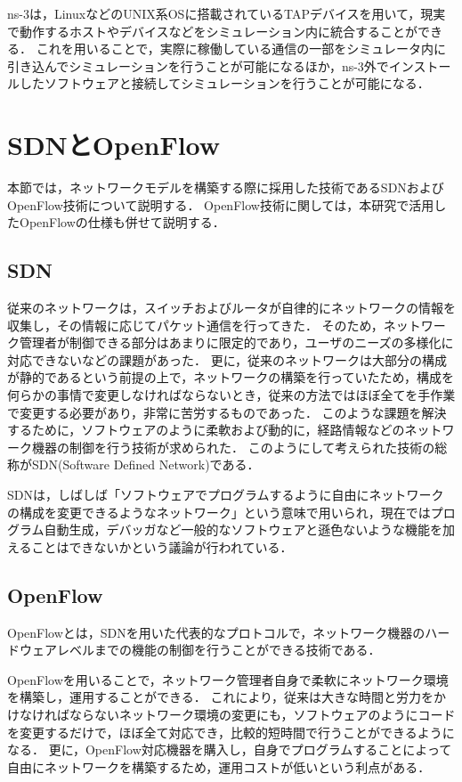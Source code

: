 ns-3は，LinuxなどのUNIX系OSに搭載されているTAPデバイスを用いて，現実で動作するホストやデバイスなどをシミュレーション内に統合することができる．
これを用いることで，実際に稼働している通信の一部をシミュレータ内に引き込んでシミュレーションを行うことが可能になるほか，ns-3外でインストールしたソフトウェアと接続してシミュレーションを行うことが可能になる．

\section{SDNとOpenFlow}

本節では，ネットワークモデルを構築する際に採用した技術であるSDNおよびOpenFlow技術について説明する．
OpenFlow技術に関しては，本研究で活用したOpenFlowの仕様も併せて説明する．

\subsection{SDN}

従来のネットワークは，スイッチおよびルータが自律的にネットワークの情報を収集し，その情報に応じてパケット通信を行ってきた\cite{openflownet}．
そのため，ネットワーク管理者が制御できる部分はあまりに限定的であり，ユーザのニーズの多様化に対応できないなどの課題があった．
更に，従来のネットワークは大部分の構成が静的であるという前提の上で，ネットワークの構築を行っていたため，構成を何らかの事情で変更しなければならないとき，従来の方法ではほぼ全てを手作業で変更する必要があり，非常に苦労するものであった．
このような課題を解決するために，ソフトウェアのように柔軟および動的に，経路情報などのネットワーク機器の制御を行う技術が求められた．
このようにして考えられた技術の総称がSDN(Software Defined Network)である．

SDNは，しばしば「ソフトウェアでプログラムするように自由にネットワークの構成を変更できるようなネットワーク」という意味で用いられ\cite{openflowjapanese}，現在ではプログラム自動生成，デバッガなど一般的なソフトウェアと遜色ないような機能を加えることはできないかという議論が行われている．

\subsection{OpenFlow}

OpenFlowとは，SDNを用いた代表的なプロトコルで，ネットワーク機器のハードウェアレベルまでの機能の制御を行うことができる技術である\cite{openflowjapanese}．

OpenFlowを用いることで，ネットワーク管理者自身で柔軟にネットワーク環境を構築し，運用することができる．
これにより，従来は大きな時間と労力をかけなければならないネットワーク環境の変更にも，ソフトウェアのようにコードを変更するだけで，ほぼ全て対応でき，比較的短時間で行うことができるようになる．
更に，OpenFlow対応機器を購入し，自身でプログラムすることによって自由にネットワークを構築するため，運用コストが低いという利点がある．

